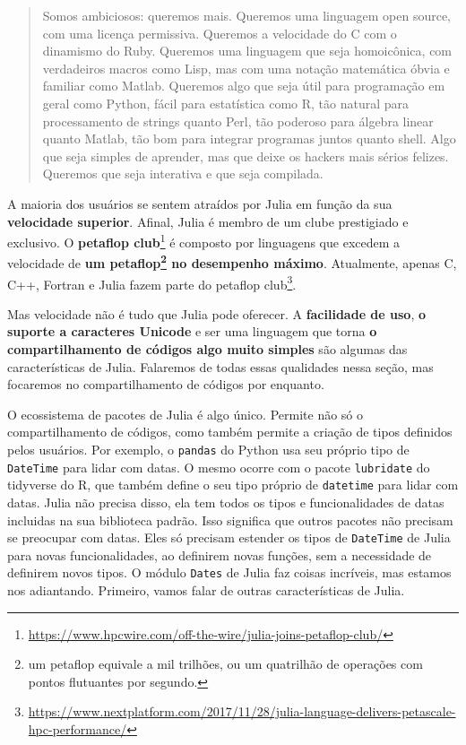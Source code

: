 \documentclass[
  notoc %
]{tufte-book}
\DeclareRobustCommand{\href}[2]{#2\footnote{\url{#1}}}
\newcommand{\passthrough}[1]{#1}
\begin{document}
\begin{quote}
Somos ambiciosos: queremos mais. Queremos uma linguagem open source, com
uma licença permissiva. Queremos a velocidade do C com o dinamismo do
Ruby. Queremos uma linguagem que seja homoicônica, com verdadeiros
macros como Lisp, mas com uma notação matemática óbvia e familiar como
Matlab. Queremos algo que seja útil para programação em geral como
Python, fácil para estatística como R, tão natural para processamento de
strings quanto Perl, tão poderoso para álgebra linear quanto Matlab, tão
bom para integrar programas juntos quanto shell. Algo que seja simples
de aprender, mas que deixe os hackers mais sérios felizes. Queremos que
seja interativa e que seja compilada.
\end{quote}

A maioria dos usuários se sentem atraídos por Julia em função da sua
\textbf{velocidade superior}. Afinal, Julia é membro de um clube
prestigiado e exclusivo. O
\href{https://www.hpcwire.com/off-the-wire/julia-joins-petaflop-club/}{\textbf{petaflop
club}} é composto por linguagens que excedem a velocidade de \textbf{um
petaflop\footnote{um petaflop equivale a mil trilhões, ou um quatrilhão
  de operações com pontos flutuantes por segundo.} no desempenho
máximo}. Atualmente, apenas C, C++, Fortran e Julia fazem parte do
\href{https://www.nextplatform.com/2017/11/28/julia-language-delivers-petascale-hpc-performance/}{petaflop
club}.

Mas velocidade não é tudo que Julia pode oferecer. A \textbf{facilidade
de uso}, \textbf{o suporte a caracteres Unicode} e ser uma linguagem que
torna \textbf{o compartilhamento de códigos algo muito simples} são
algumas das características de Julia. Falaremos de todas essas
qualidades nessa seção, mas focaremos no compartilhamento de códigos por
enquanto.

O ecossistema de pacotes de Julia é algo único. Permite não só o
compartilhamento de códigos, como também permite a criação de tipos
definidos pelos usuários. Por exemplo, o
\passthrough{\lstinline!pandas!} do Python usa seu próprio tipo de
\passthrough{\lstinline!DateTime!} para lidar com datas. O mesmo ocorre
com o pacote \passthrough{\lstinline!lubridate!} do tidyverse do R, que
também define o seu tipo próprio de \passthrough{\lstinline!datetime!}
para lidar com datas. Julia não precisa disso, ela tem todos os tipos e
funcionalidades de datas incluidas na sua biblioteca padrão. Isso
significa que outros pacotes não precisam se preocupar com datas. Eles
só precisam estender os tipos de \passthrough{\lstinline!DateTime!} de
Julia para novas funcionalidades, ao definirem novas funções, sem a
necessidade de definirem novos tipos. O módulo
\passthrough{\lstinline!Dates!} de Julia faz coisas incríveis, mas
estamos nos adiantando. Primeiro, vamos falar de outras características
de Julia.
\end{document}
